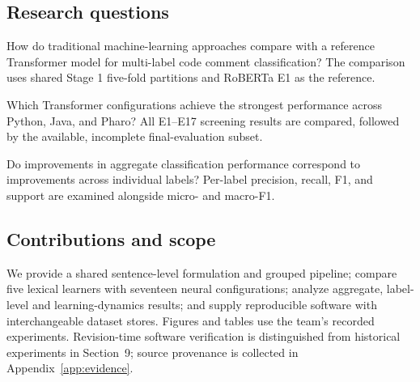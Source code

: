 \subsection{Research questions}
\begin{description}[style=nextline,leftmargin=0pt,labelindent=0pt,labelwidth=0pt]
\item[RQ1.] How do traditional machine-learning approaches compare with a reference Transformer model for multi-label code comment classification? The comparison uses shared Stage 1 five-fold partitions and RoBERTa E1 as the reference.
\item[RQ2.] Which Transformer configurations achieve the strongest performance across Python, Java, and Pharo? All E1--E17 screening results are compared, followed by the available, incomplete final-evaluation subset.
\item[RQ3.] Do improvements in aggregate classification performance correspond to improvements across individual labels? Per-label precision, recall, F1, and support are examined alongside micro- and macro-F1.
\end{description}

\subsection{Contributions and scope}
We provide a shared sentence-level formulation and grouped pipeline; compare five lexical learners with seventeen neural configurations; analyze aggregate, label-level and learning-dynamics results; and supply reproducible software with interchangeable dataset stores. Figures and tables use the team's recorded experiments. Revision-time software verification is distinguished from historical experiments in Section~9; source provenance is collected in Appendix~\ref{app:evidence}.
